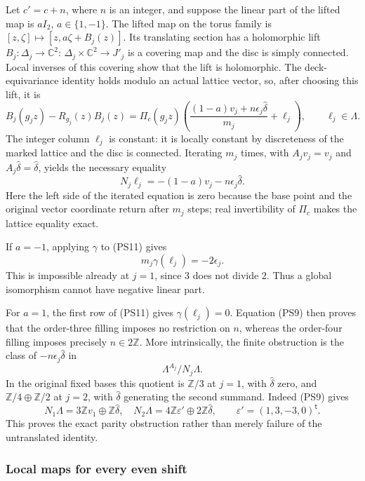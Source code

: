 Let $c'=c+n$, where $n$ is an integer, and suppose the linear part of
the lifted map is $aI_2$, $a\in\{1,-1\}$. The lifted map on the torus
family is $[z,\zeta]\mapsto[z,a\zeta+B_j(z)]$. Its translating
section has a holomorphic lift $B_j:\Delta_j\to\mathbb C^2$:
$\Delta_j\times\mathbb C^2\to J'_j$ is a covering map and the disc is
simply connected. Local inverses of this covering show that the lift
is holomorphic. The deck-equivariance identity holds modulo an
actual lattice vector, so, after choosing this lift, it is
\[
 B_j(g_jz)-R_{g_j}(z)B_j(z)
  =\Pi_c(g_jz)\left(
       \frac{(1-a)v_j+n\epsilon_j\widehat\delta}{m_j}
          +\ell_j\right),\qquad \ell_j\in\Lambda.
 \tag{PS10}\label{wb:pshift:eq:finite-equation}
\]
The integer column $\ell_j$ is constant: it is locally constant by
discreteness of the marked lattice and the disc is connected.
Iterating $m_j$ times, with $A_jv_j=v_j$ and
$A_j\widehat\delta=\widehat\delta$, yields the necessary equality
\[
 N_j\ell_j=-(1-a)v_j-n\epsilon_j\widehat\delta.
 \tag{PS11}\label{wb:pshift:eq:finite-norm-obstruction}
\]
Here the left side of the iterated equation is zero because the
base point and the original vector coordinate return after $m_j$
steps; real invertibility of $\Pi_c$ makes the lattice equality exact.

If $a=-1$, applying $\gamma$ to (PS11) gives
\[
                   m_j\gamma(\ell_j)=-2\epsilon_j.
\]
This is impossible already at $j=1$, since $3$ does not divide $2$.
Thus a global isomorphism cannot have negative linear part.

For $a=1$, the first row of (PS11) gives $\gamma(\ell_j)=0$.
Equation (PS9) then proves that the order-three filling imposes no
restriction on $n$, whereas the order-four filling imposes precisely
$n\in2\mathbb Z$. More intrinsically, the finite obstruction is the
class of $-n\epsilon_j\widehat\delta$ in
\[
 \Lambda^{A_j}/N_j\Lambda.
 \tag{PS12}\label{wb:pshift:eq:finite-class}
\]
In the original fixed bases this quotient is
$\mathbb Z/3$ at $j=1$, with $\widehat\delta$ zero, and
$\mathbb Z/4\oplus\mathbb Z/2$ at $j=2$, with
$\widehat\delta$ generating the second summand. Indeed (PS9) gives
\[
 N_1\Lambda=3\mathbb Z v_1\oplus\mathbb Z\widehat\delta,
 \quad
 N_2\Lambda=4\mathbb Z\varepsilon'\oplus
                      2\mathbb Z\widehat\delta,
 \qquad \varepsilon'=(1,3,-3,0)^{\mathsf t}.
\]
This proves the exact parity obstruction rather than merely failure
of the untranslated identity.

\subsubsection{Local maps for every even shift}

